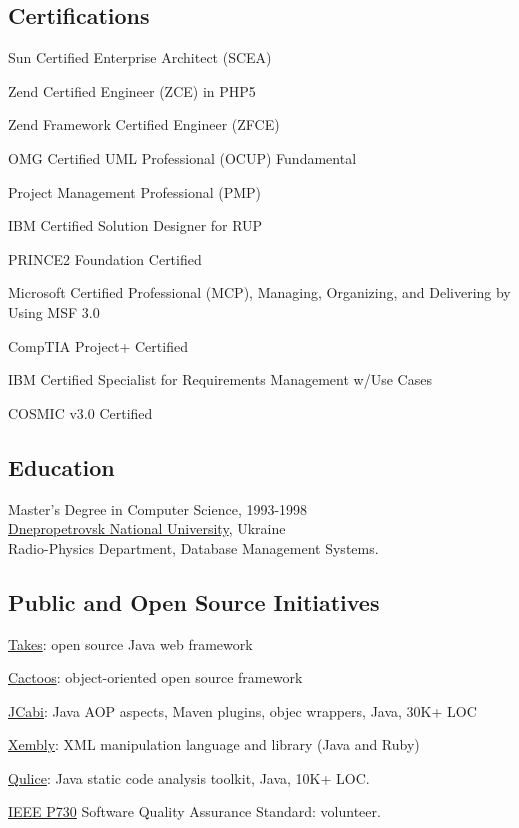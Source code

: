 \documentclass[12pt]{article}
\begin{document}
\subsection*{Certifications}

Sun Certified Enterprise Architect (SCEA)

Zend Certified Engineer (ZCE) in PHP5

Zend Framework Certified Engineer (ZFCE)

OMG Certified UML Professional (OCUP) Fundamental

Project Management Professional (PMP)

IBM Certified Solution Designer for RUP

PRINCE2 Foundation Certified

Microsoft Certified Professional (MCP), Managing, Organizing, and Delivering by Using MSF 3.0

CompTIA Project+ Certified

IBM Certified Specialist for Requirements Management w/Use Cases

COSMIC v3.0 Certified

\subsection*{Education}

Master's Degree in Computer Science, 1993-1998\\
\href{http://dnu.dp.ua/}{Dnepropetrovsk National University}, Ukraine\\
Radio-Physics Department, Database Management Systems.

\subsection*{Public and Open Source Initiatives}

\href{http://www.takes.org}{Takes}: open source Java web framework

\href{http://www.cactoos.org}{Cactoos}: object-oriented open source framework

\href{http://www.jcabi.com}{JCabi}: Java AOP aspects, Maven plugins, objec wrappers, Java, 30K+ LOC

\href{http://www.xembly.org}{Xembly}: XML manipulation language and library (Java and Ruby)

\href{http://www.qulice.com}{Qulice}: Java static code analysis toolkit, Java, 10K+ LOC.

\href{http://ieeexplore.ieee.org/document/6835311/}{IEEE P730} Software Quality Assurance Standard: volunteer.
\end{document}
